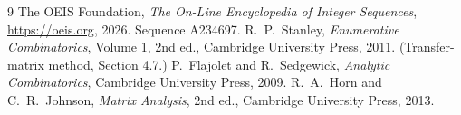 \documentclass[11pt,a4paper]{article}
\theoremstyle{plain}
\theoremstyle{definition}
\begin{document}
\begin{thebibliography}{9}
 The OEIS Foundation, \emph{The On-Line Encyclopedia of Integer
Sequences}, \url{https://oeis.org}, 2026. Sequence A234697.
 R.~P.~Stanley, \emph{Enumerative Combinatorics}, Volume 1, 2nd ed.,
Cambridge University Press, 2011. (Transfer-matrix method, Section 4.7.)
 P.~Flajolet and R.~Sedgewick, \emph{Analytic Combinatorics}, Cambridge
University Press, 2009.
 R.~A.~Horn and C.~R.~Johnson, \emph{Matrix Analysis}, 2nd ed., Cambridge
University Press, 2013.
\end{thebibliography}
\end{document}
